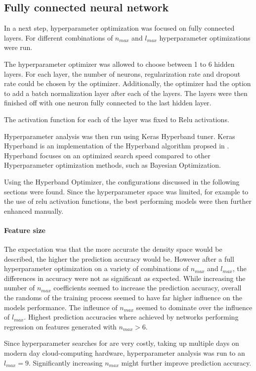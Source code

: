 \subsection{Fully connected neural network}

In a next step, hyperparameter optimization was focused on fully connected layers.
For different combinations of $n_{max}$ and $l_{max}$ hyperparameter optimizations were run.

The hyperparameter optimizer was allowed to choose between 1 to 6 hidden layers.
For each layer, the number of neurons, regularization rate and dropout rate could be chosen by the optimizer.
Additionally, the optimizer had the option to add a batch normalization layer after each of the layers.
The layers were then finished off with one neuron fully connected to the last hidden layer.

The activation function for each of the layer was fixed to Relu activations.

Hyperparameter analysis was then run using Keras Hyperband tuner.
Keras Hyperband is an  implementation of the Hyperband algorithm propsed in \cite{li2017hyperband}.
Hyperband focuses on an optimized search speed compared to other Hyperparameter optimization methods, such as
Bayesian Optimization. %

Using the Hyperband Optimizer, the configurations discussed in the following sections were found.
Since the hyperparameter space was limited, for example to the use of relu activation functions,
the best performing models were then further enhanced manually.

\paragraph{Feature size}
The expectation was that the more accurate the density space would be described, the higher the prediction accuracy would be.
However after a full hyperparameter optimization on a variety of combinations of $n_{max}$ and $l_{max}$,
the differences in accuracy were not as significant as expected.
While increasing the number of $n_{max}$ coefficients seemed to increase the prediction accuracy,
overall the randoms of the training process seemed to have far higher influence on the models performance.
The infleunce of $n_{max}$ seemed to dominate over the influence of $l_{max}$.
Highest prediction accuracies where achieved by networks performing regression on features generated with $n_{max} > 6$.

Since hyperparameter searches for are very costly, taking up multiple days on modern day cloud-computing hardware,
hyperparameter analysis was run to an $l_{max} = 9$.
Significantly increasing $n_{max}$ might further improve prediction accuracy.

